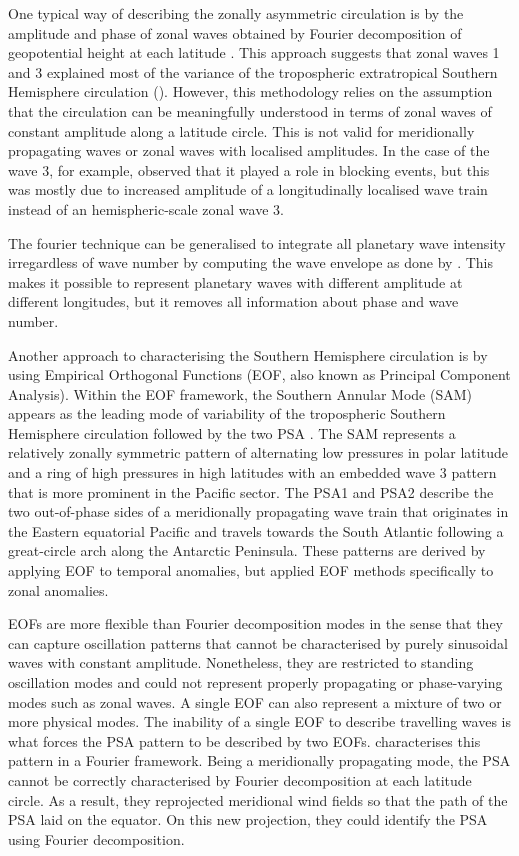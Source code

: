\documentclass[smallextended]{svjour3}       %
\begin{document}
One typical way of describing the zonally asymmetric circulation is by the amplitude and phase of zonal waves obtained by Fourier decomposition of geopotential height at each latitude \citep[e.g.][]{vanloon1972, trenberth1980, turner2017}.
This approach suggests that zonal waves 1 and 3 explained most of the variance of the tropospheric extratropical Southern Hemisphere circulation (\citet{vanloon1972}).
However, this methodology relies on the assumption that the circulation can be meaningfully understood in terms of zonal waves of constant amplitude along a latitude circle.
This is not valid for meridionally propagating waves or zonal waves with localised amplitudes.
In the case of the wave 3, for example, \citet{trenberth1985} observed that it played a role in blocking events, but this was mostly due to increased amplitude of a longitudinally localised wave train instead of an hemispheric-scale zonal wave 3.

The fourier technique can be generalised to integrate all planetary wave intensity irregardless of wave number by computing the wave envelope as done by \citet{irving2015}.
This makes it possible to represent planetary waves with different amplitude at different longitudes, but it removes all information about phase and wave number.

Another approach to characterising the Southern Hemisphere circulation is by using Empirical Orthogonal Functions (EOF, also known as Principal Component Analysis).
Within the EOF framework, the Southern Annular Mode (SAM) appears as the leading mode of variability of the tropospheric Southern Hemisphere circulation \citep{fogt2020} followed by the two PSA \citep{mo2001}.
The SAM represents a relatively zonally symmetric pattern of alternating low pressures in polar latitude and a ring of high pressures in high latitudes with an embedded wave 3 pattern that is more prominent in the Pacific sector.
The PSA1 and PSA2 describe the two out-of-phase sides of a meridionally propagating wave train that originates in the Eastern equatorial Pacific and travels towards the South Atlantic following a great-circle arch along the Antarctic Peninsula.
These patterns are derived by applying EOF to temporal anomalies, but \citet{raphael2003} applied EOF methods specifically to zonal anomalies.

EOFs are more flexible than Fourier decomposition modes in the sense that they can capture oscillation patterns that cannot be characterised by purely sinusoidal waves with constant amplitude.
Nonetheless, they are restricted to standing oscillation modes and could not represent properly propagating or phase-varying modes such as zonal waves.
A single EOF can also represent a mixture of two or more physical modes.
The inability of a single EOF to describe travelling waves is what forces the PSA pattern to be described by two EOFs.
\citet{irving2016} characterises this pattern in a Fourier framework.
Being a meridionally propagating mode, the PSA cannot be correctly characterised by Fourier decomposition at each latitude circle.
As a result, they reprojected meridional wind fields so that the path of the PSA laid on the equator.
On this new projection, they could identify the PSA using Fourier decomposition.
\end{document}
